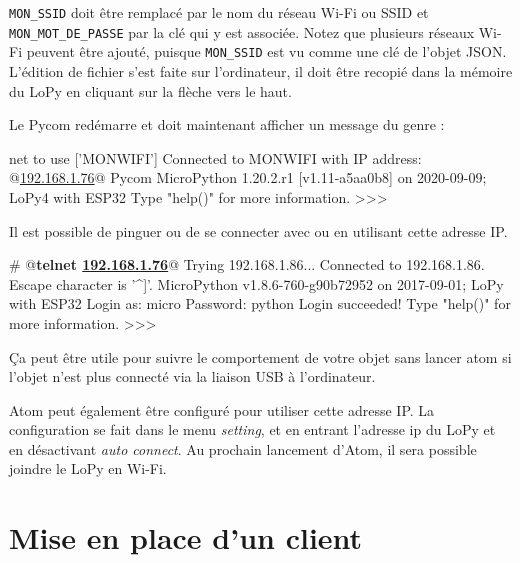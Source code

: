 
\texttt{MON\_SSID} doit être remplacé par le nom du réseau Wi-Fi ou \ac{SSID} et \texttt{MON\_MOT\_DE\_PASSE} par la clé qui y est associée. Notez que plusieurs réseaux Wi-Fi peuvent être ajouté, puisque \texttt{MON\_SSID} est vu comme une clé de l'objet JSON. L'édition de fichier s'est faite sur l'ordinateur, il doit être recopié dans la mémoire du LoPy en cliquant sur la flèche vers le haut.

Le Pycom redémarre et doit maintenant afficher un message du genre :

\begin{termc}[backgroundcolor=\color{gray!10}, basicstyle=\ttfamily\small, escapechar=@]
net to use ['MONWIFI']
Connected to MONWIFI with IP address: @\ul{192.168.1.76}@
Pycom MicroPython 1.20.2.r1 [v1.11-a5aa0b8] on 2020-09-09; LoPy4 with ESP32
Type "help()" for more information.
>>> 
\end{termc}



Il est possible de pinguer ou de se connecter avec  ou  en utilisant cette adresse IP.

\begin{termc}[backgroundcolor=\color{palerod},  basicstyle=\ttfamily\small, escapechar=@]
# @\textbf{telnet \ul{192.168.1.76}}@
Trying 192.168.1.86...
Connected to 192.168.1.86.
Escape character is '^]'.
MicroPython v1.8.6-760-g90b72952 on 2017-09-01; LoPy with ESP32
Login as: micro
Password: python
Login succeeded!
Type "help()" for more information.
>>>
\end{termc}


Ça peut être utile pour suivre le comportement de votre objet sans lancer atom si l'objet n'est plus connecté via la liaison USB à l'ordinateur. 

Atom peut également être configuré pour utiliser cette adresse IP. La configuration se fait dans le menu \textit{setting}, et en entrant l'adresse ip du LoPy et en désactivant \textit{auto connect}. Au prochain lancement d'Atom, il sera possible joindre le LoPy en Wi-Fi.


\section{Mise en place d'un client}

\begin{figure}
\end{figure}



